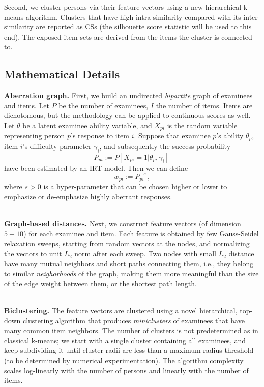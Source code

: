 \documentclass{article}
\begin{document}
Second, we cluster persons via their feature vectors using a new hierarchical k-means algorithm. Clusters that have high intra-similarity compared with its inter-similarity are reported as CSs (the silhouette score statistic will be used to this end). The exposed item sets are derived from the items the cluster is connected to.

\subsection{Mathematical Details}
{\bf Aberration graph.} First, we build an undirected {\it bipartite} graph of examinees and items. Let $P$ be the number of examinees, $I$ the number of items. Items are dichotomous, but the methodology can be applied to continuous scores as well. Let $\theta$ be a latent examinee ability variable, and $X_{pi}$ is the random variable representing person $p$'s response to item $i$. Suppose that examinee $p$'s ability $\theta_p$, item $i$'s difficulty parameter $\gamma_i$, and subsequently the success probability
\begin{equation}
	P_{pi} := P \left [X_{pi}=1 | \theta_p, \gamma_i \right]\,
	\label{ppi} 
\end{equation}
have been estimated by an IRT model. Then we can define
\begin{equation}
  w_{pi} := P_{pi}^{-s} \,,
  \label{weight}
\end{equation}
where $s  > 0$ is a hyper-parameter that can be chosen higher or lower to emphasize or de-emphasize highly aberrant responses.

{\mbox{}}\\
{\bf Graph-based distances.} Next, we construct feature vectors (of dimension $5-10$) for each examinee and item. Each feature is obtained by few Gauss-Seidel relaxation sweeps, starting from random vectors  at the nodes, and normalizing the vectors to unit $L_2$ norm after each sweep. Two nodes with small $L_2$ distance have many mutual neighbors and short paths connecting them, i.e., they belong to similar {\it neighorhoods} of the graph, making them more meaningful than the size of the edge weight between them, or the shortest path length.

{\mbox{}}\\
{\bf Biclustering.} The feature vectors are clustered using a novel hierarchical, top-down clustering algorithm that produces {\it miniclusters} of examinees that have many common item neighbors. The number of clusters is not predetermined as in classical k-means; we start with a single cluster containing all examinees, and keep subdividing it until cluster radii are less than a maximum radius threshold (to be determined by numerical experimentation). The algorithm complexity scales log-linearly with the number of persons and linearly with the number of items. 
\end{document}
